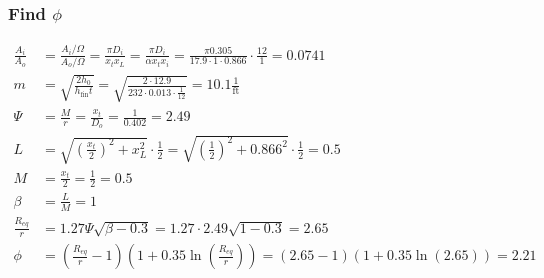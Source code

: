 \subsubsection{Find $\phi$}
\begin{align*}
    \frac{A_i}{A_o}  & = \frac{A_{i} / \Omega}{A_{o} / \Omega} = \frac{\pi D_i}{x_t x_L} = \frac{\pi D_i}{\alpha x_t x_i} = \frac{\pi 0.305}{17.9 \cdot 1 \cdot 0.866} \cdot \frac{12}{1} = 0.0741 \\
    m                & = \sqrt{\frac{2 h_0}{h_\text{fin} t}} = \sqrt{\frac{2 \cdot 12.9}{232 \cdot 0.013 \cdot \frac{1}{12}}} = 10.1 \frac{1}{\text{ft}}                                           \\
    \Psi             & = \frac{M}{r} = \frac{x_t}{D_o} = \frac{1}{0.402} = 2.49                                                                                                                    \\
    L                & = \sqrt{\left(\frac{x_t}{2}\right)^2 + x_L^2} \cdot \frac{1}{2} = \sqrt{\left(\frac{1}{2}\right)^2 + 0.866^2} \cdot \frac{1}{2} = 0.5                                       \\
    M                & = \frac{x_t}{2} = \frac{1}{2} = 0.5                                                                                                                                         \\
    \beta            & = \frac{L}{M} = 1                                                                                                                                                           \\
    \frac{R_{eq}}{r} & = 1.27 \Psi \sqrt{\beta - 0.3} = 1.27 \cdot 2.49 \sqrt{1 - 0.3} = 2.65                                                                                                      \\
    \phi             & = \left(\frac{R_{eq}}{r} - 1\right)\left(1 + 0.35 \ln\left(\frac{R_{eq}}{r}\right)\right) = \left(2.65 - 1\right)\left(1 + 0.35 \ln(2.65)\right) = 2.21
\end{align*}
